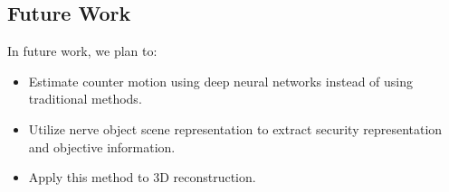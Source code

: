 \documentclass[10pt, twocolumn]{article}
\begin{document}
\subsection{Future Work}
In future work, we plan to:

\begin{itemize}
  \item Estimate counter motion using deep neural networks instead of using traditional methods.
  \item Utilize nerve object scene representation to extract security representation and objective information.
  \item Apply this method to 3D reconstruction.
\end{itemize}



\end{document}
